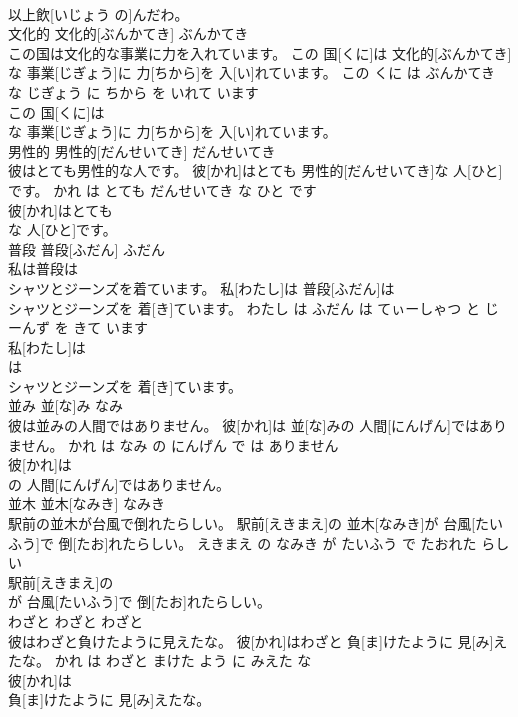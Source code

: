 \documentclass[8pt]{extreport}
\begin{document}
\begin{CJK}{UTF8}{min}
\\	以上飲[いじょう の]んだわ。			
\\	文化的	文化的[ぶんかてき]	ぶんかてき	
\\	この国は文化的な事業に力を入れています。	この 国[くに]は 文化的[ぶんかてき]な 事業[じぎょう]に 力[ちから]を 入[い]れています。	この くに は ぶんかてき な じぎょう に ちから を いれて います	
\\	この 国[くに]は
\\	な 事業[じぎょう]に 力[ちから]を 入[い]れています。			
\\	男性的	男性的[だんせいてき]	だんせいてき	
\\	彼はとても男性的な人です。	彼[かれ]はとても 男性的[だんせいてき]な 人[ひと]です。	かれ は とても だんせいてき な ひと です	
\\	彼[かれ]はとても
\\	な 人[ひと]です。			
\\	普段	普段[ふだん]	ふだん	
\\	私は普段は
\\	シャツとジーンズを着ています。	私[わたし]は 普段[ふだん]は 
\\	[てぃー]シャツとジーンズを 着[き]ています。	わたし は ふだん は てぃーしゃつ と じーんず を きて います	
\\	私[わたし]は
\\	は 
\\	[てぃー]シャツとジーンズを 着[き]ています。			
\\	並み	並[な]み	なみ	
\\	彼は並みの人間ではありません。	彼[かれ]は 並[な]みの 人間[にんげん]ではありません。	かれ は なみ の にんげん で は ありません	
\\	彼[かれ]は
\\	の 人間[にんげん]ではありません。			
\\	並木	並木[なみき]	なみき	
\\	駅前の並木が台風で倒れたらしい。	駅前[えきまえ]の 並木[なみき]が 台風[たいふう]で 倒[たお]れたらしい。	えきまえ の なみき が たいふう で たおれた らしい	
\\	駅前[えきまえ]の
\\	が 台風[たいふう]で 倒[たお]れたらしい。			
\\	わざと	わざと	わざと	
\\	彼はわざと負けたように見えたな。	彼[かれ]はわざと 負[ま]けたように 見[み]えたな。	かれ は わざと まけた よう に みえた な	
\\	彼[かれ]は
\\	負[ま]けたように 見[み]えたな。			

\end{CJK}
\end{document}
